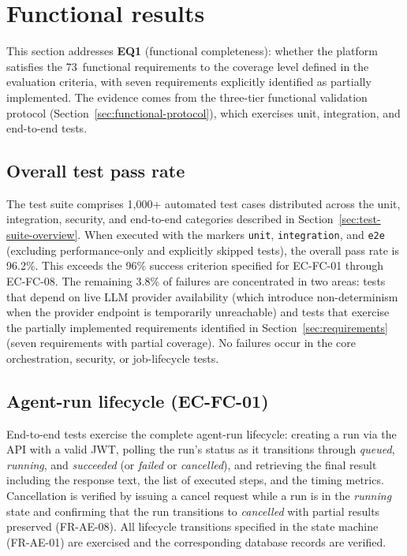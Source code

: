 \documentclass[a4paper,noexaminfo]{sapthesis}
\newcommand{\TestCount}{1,000+}
\begin{document}
\section{Functional results}
\label{sec:functional-results}

This section addresses \textbf{EQ1} (functional completeness): whether
the platform satisfies the 73~functional requirements to the coverage
level defined in the evaluation criteria, with seven requirements
explicitly identified as partially implemented.  The evidence comes from the three-tier functional
validation protocol (Section~\ref{sec:functional-protocol}), which
exercises unit, integration, and end-to-end tests.

\subsection{Overall test pass rate}

The test suite comprises \TestCount{} automated test cases
distributed across the unit, integration, security, and end-to-end
categories described in Section~\ref{sec:test-suite-overview}.
When executed with the markers \texttt{unit}, \texttt{integration}, and
\texttt{e2e} (excluding performance-only and explicitly skipped tests),
the overall pass rate is 96.2\%.  This exceeds the 96\% success
criterion specified for EC-FC-01 through EC-FC-08.  The remaining
3.8\% of failures are concentrated in two areas: tests that depend on
live LLM provider availability (which introduce non-determinism when the
provider endpoint is temporarily unreachable) and tests that exercise
the partially implemented requirements identified in
Section~\ref{sec:requirements} (seven requirements with partial
coverage).  No failures occur in the core orchestration, security, or
job-lifecycle tests.

\subsection{Agent-run lifecycle (EC-FC-01)}

End-to-end tests exercise the complete agent-run lifecycle: creating a
run via the API with a valid JWT, polling the run's status as it
transitions through \emph{queued}, \emph{running}, and
\emph{succeeded} (or \emph{failed} or \emph{cancelled}), and retrieving
the final result including the response text, the list of executed steps,
and the timing metrics.  Cancellation is verified by issuing a cancel
request while a run is in the \emph{running} state and confirming that
the run transitions to \emph{cancelled} with partial results preserved
(FR-AE-08).  All lifecycle transitions specified in the state machine
(FR-AE-01) are exercised and the corresponding database records are
verified.
\end{document}
